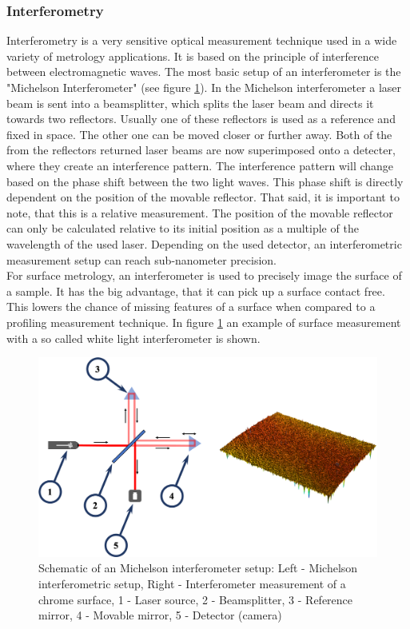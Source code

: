 \subsubsection{Interferometry}
Interferometry is a very sensitive optical measurement technique used in a wide variety of metrology applications. It is based on the principle of interference between electromagnetic waves. The most basic setup of an interferometer is the "Michelson Interferometer" (see figure \ref{Interferometer}). In the Michelson interferometer a laser beam is sent into a beamsplitter, which splits the laser beam and directs it towards two reflectors. Usually one of these reflectors is used as a reference and fixed in space. The other one can be moved closer or further away. Both of the from the reflectors returned laser beams are now superimposed onto a detecter, where they create an interference pattern. The interference pattern will change based on the phase shift between the two light waves. This phase shift is directly dependent on the position of the movable reflector. That said, it is important to note, that this is a relative measurement. The position of the movable reflector can only be calculated relative to its initial position as a multiple of the wavelength of the used laser. Depending on the used detector, an interferometric measurement setup can reach sub-nanometer precision.\\
For surface metrology, an interferometer is used to precisely image the surface of a sample. It has the big advantage, that it can pick up a surface contact free. This lowers the chance of missing features of a surface when compared to a profiling measurement technique. In figure \ref{Interferometer} an example of surface measurement with a so called white light interferometer is shown.


\begin{figure}
\begin{center}
\includegraphics[width=12cm]{Pictures/Interferometer}
\caption[Schematic of an Michelson interferometer setup]{Schematic of an Michelson interferometer setup: Left - Michelson interferometric setup, Right - Interferometer measurement of a chrome surface, 1 - Laser source, 2 - Beamsplitter, 3 - Reference mirror, 4 - Movable mirror, 5 - Detector (camera)}
\label{Interferometer}
\end{center}
\end{figure}











